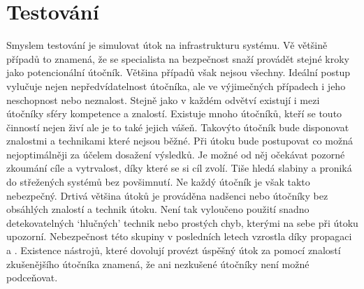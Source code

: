 \section{Testování}\label{sec:testovani}
Smyslem testování je simulovat útok na infrastrukturu systému.
Vě většině případů to znamená, že se specialista na bezpečnost snaží provádět stejné kroky jako potencionální útočník.
Většina případů však nejsou všechny.
Ideální postup vylučuje nejen nepředvídatelnost útočníka, ale ve výjimečných případech i jeho neschopnost nebo neznalost.
Stejně jako v každém odvětví existují i mezi útočníky sféry kompetence a znalostí.
Existuje mnoho útočníků, kteří se touto činností nejen živí ale je to také jejich vášeň.
Takovýto útočník bude disponovat znalostmi a technikami které nejsou běžné.
Při útoku bude postupovat co možná nejoptimálněji za účelem dosažení výsledků.
Je možné od něj očekávat pozorné zkoumání cíle a vytrvalost, díky které se si cíl zvolí.
Tiše hledá slabiny a proniká do střežených systémů bez povšimnutí.
Ne každý útočník je však takto nebezpečný.
Drtivá většina útoků je prováděna nadšenci nebo útočníky bez obsáhlých znalostí a technik útoku.
Není tak vyloučeno použití snadno detekovatelných `hlučných' technik nebo prostých chyb, kterými na sebe při útoku upozorní.
Nebezpečnost této skupiny v posledních letech vzrostla díky propagaci \cite{MaaS_ATaT} a \cite{RaaS_microsoft}.
Existence nástrojů, které dovolují provézt úspěšný útok za pomocí znalostí zkušenějšího útočníka znamená, že ani nezkušené útočníky není možné podceňovat.

